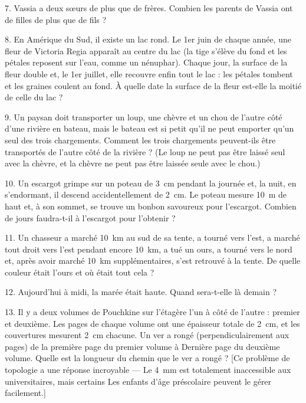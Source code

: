 \begin{problem}{7.}
Vassia a deux sœurs de plus que de frères. Combien les parents de Vassia ont de filles de plus que de fils ?
\end{problem}

\begin{problem}{8.}
En Amérique du Sud, il existe un lac rond. Le 1er juin de chaque année, une fleur de Victoria Regia apparaît au centre du lac (la tige s'élève du fond et les pétales reposent sur l'eau, comme un nénuphar). Chaque jour, la surface de la fleur double et, le 1er juillet, elle recouvre enfin tout le lac : les pétales tombent et les graines coulent au fond. À quelle date la surface de la fleur est-elle la moitié de celle du lac ?
\end{problem}

\begin{problem}{9.}
Un paysan doit transporter un loup, une chèvre et un chou de l'autre côté d'une rivière en bateau, mais le bateau est si petit qu'il ne peut emporter qu'un seul des trois chargements. Comment les trois chargements peuvent-ils être transportés de l'autre côté de la rivière ? (Le loup ne peut pas être laissé seul avec la chèvre, et la chèvre ne peut pas être laissée seule avec le chou.)
\end{problem}

\begin{problem}{10.}
Un escargot grimpe sur un poteau de \SI{3}{\cm} pendant la journée et, la nuit, en s'endormant, il descend accidentellement de \SI{2}{\cm}. Le poteau mesure \SI{10}{\metre} de haut et, à son sommet, se trouve un bonbon savoureux pour l'escargot. Combien de jours faudra-t-il à l'escargot pour l'obtenir ?
\end{problem}

\begin{problem}{11.}
Un chasseur a marché \SI{10}{\km} au sud de sa tente, a tourné vers l'est, a marché tout droit vers l'est pendant encore \SI{10}{\km}, a tué un ours, a tourné vers le nord et, après avoir marché \SI{10}{\km} supplémentaires, s'est retrouvé à la tente. De quelle couleur était l'ours et où était tout cela ?
\end{problem}

\begin{problem}{12.}
Aujourd'hui à midi, la marée était haute. Quand sera-t-elle là demain ?
\end{problem}

\begin{problem}{13.}
Il y a deux volumes de Pouchkine sur l'étagère l'un à côté de l'autre : premier et deuxième. Les pages de chaque volume ont une épaisseur totale de \SI{2}{\cm}, et les couvertures mesurent \SI{2}{\cm} chacune. Un ver a rongé (perpendiculairement aux pages) de la première page du premier volume à Dernière page du deuxième volume. Quelle est la longueur du chemin que le ver a rongé ? [Ce problème de topologie a une réponse incroyable –– Le \SI{4}{\mm} est totalement inaccessible aux universitaires, mais certains Les enfants d’âge préscolaire peuvent le gérer facilement.]
\end{problem}

